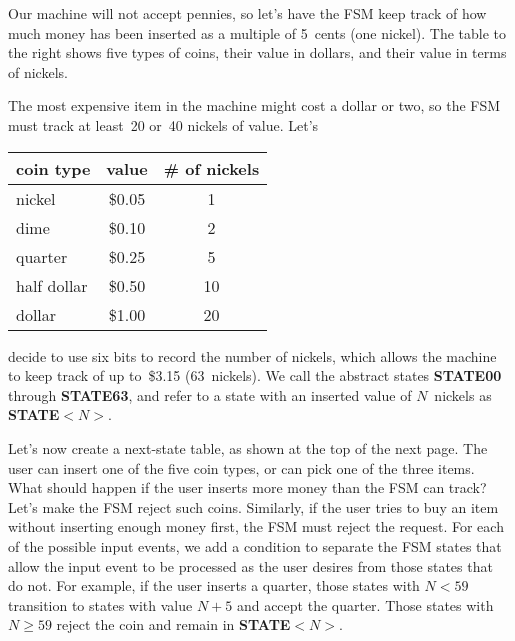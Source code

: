 \begin{minipage}{4.1in}
Our machine will not accept pennies, so let's have the FSM keep track of
how much money has been inserted as a multiple of 5~cents (one nickel).
The table to the right shows five types of coins, their value in 
dollars, and their value in terms of nickels.\mpline

The most expensive item in the machine might cost a dollar or two, so
the FSM must track at least~20 or~40 nickels of value.  Let's\linebreak
\end{minipage}\hspace{0.25in}%
\begin{minipage}{2.15in}
\begin{tabular}{l|c|c}
\multicolumn{1}{c|}{coin type}& value& \# of nickels\\ \hline
nickel&      \$0.05& 1\\
dime&        \$0.10& 2\\
quarter&     \$0.25& 5\\
half dollar& \$0.50& 10\\
dollar&      \$1.00& 20
\end{tabular}\vspace{12pt}
\end{minipage}\mpdone

decide to
use six bits to record the number of nickels, which allows the machine
to keep track of up to~\$3.15 (63~nickels).  We call the abstract
states {\bf STATE00} through {\bf STATE63}, and refer to a state with
an inserted value of $N$~nickels as {\bf STATE${<}N{>}$}.

Let's now create a next-state table, as shown at the top of the next page.
The user can insert one of the five coin types, or can pick one of the 
three items.  What should happen if the user inserts more money than the 
FSM can track?  Let's make the FSM reject such coins.  Similarly, if the 
user tries to buy an item without inserting enough money first, the FSM 
must reject the request.  For each of the possible input events, we add a 
condition to separate the FSM states that allow the input event to 
be processed as the user desires from those states that do not.  For example,
if the user inserts a quarter, those states with $N<59$ transition to
states with value $N+5$ and accept the quarter.  Those states with
$N\geq{59}$ reject the coin and remain in {\bf STATE${<}N{>}$}.


